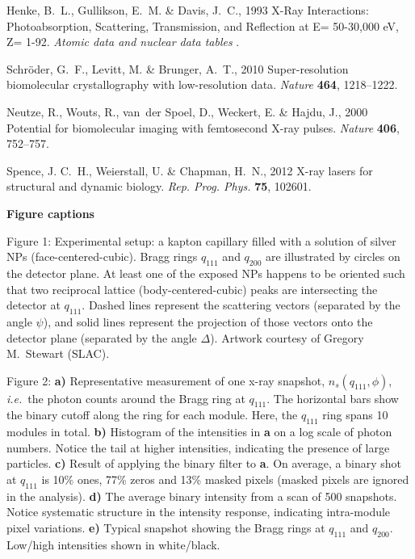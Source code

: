 \documentclass [11pt,fleqn]{article}
\begin{document}
\begin{thebibliography}{10}
Henke, B.~L., Gullikson, E.~M. \& Davis, J.~C., 1993 {X-Ray Interactions:
  Photoabsorption, Scattering, Transmission, and Reflection at E= 50-30,000 eV,
  Z= 1-92}.
\newblock \emph{Atomic data and nuclear data tables} .

Schr{\"o}der, G.~F., Levitt, M. \& Brunger, A.~T., 2010 {Super-resolution
  biomolecular crystallography with low-resolution data}.
\newblock \emph{Nature} \textbf{464}, 1218--1222.

Neutze, R., Wouts, R., van~der Spoel, D., Weckert, E. \& Hajdu, J., 2000
  {Potential for biomolecular imaging with femtosecond X-ray pulses.}
\newblock \emph{Nature} \textbf{406}, 752--757.

Spence, J. C.~H., Weierstall, U. \& Chapman, H.~N., 2012 {X-ray lasers for
  structural and dynamic biology}.
\newblock \emph{Rep. Prog. Phys.} \textbf{75}, 102601.

\end{thebibliography}

{\bf Figure captions}

Figure 1: 
Experimental setup: a kapton capillary filled with a solution of silver NPs (face-centered-cubic). Bragg rings $q_{111}$ and $q_{200}$ are illustrated by circles on the detector plane. At least one of the exposed NPs happens to be oriented such that two reciprocal lattice (body-centered-cubic) peaks are intersecting the detector at $q_{111}$. Dashed lines represent the scattering vectors (separated by the angle $\psi$), and solid lines represent the projection of those vectors onto the detector plane (separated by the angle $\Delta$). Artwork courtesy of Gregory M.~Stewart (SLAC).

Figure 2:
{\bf a)} Representative measurement of one x-ray snapshot, $n_{s}( q_{111},\phi)$, \textit{i.e.}~the photon counts around the Bragg ring at $q_{111}$. The horizontal bars show the binary cutoff along the ring for each module. Here, the $q_{111}$ ring spans 10 modules in total. {\bf b)} Histogram of the intensities in {\bf a} on a log scale of photon numbers. Notice the tail at higher intensities, indicating the presence of large particles. {\bf c)} Result of applying the binary filter to {\bf a}. On average, a binary shot at $q_{111}$ is 10\% ones, 77\% zeros and 13\% masked pixels (masked pixels are ignored in the analysis).  {\bf d)} The average binary intensity from a scan of 500 snapshots. Notice systematic structure in the intensity response, indicating intra-module pixel variations. {\bf e)} Typical snapshot showing the Bragg rings at $q_{111}$ and $q_{200}$. Low/high intensities shown in white/black.
\end{document}

